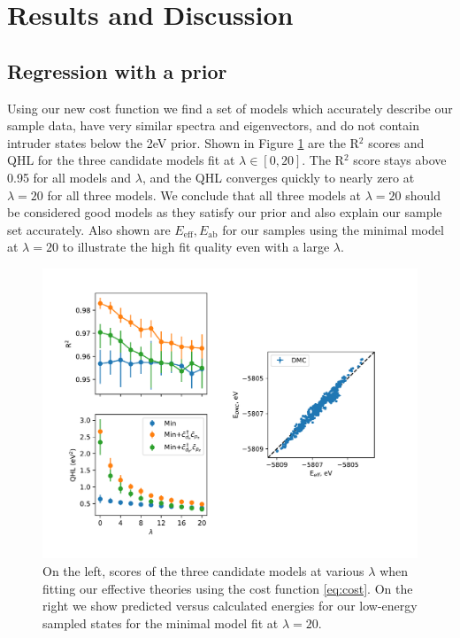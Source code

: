 \documentclass{article}
\begin{document}
\section{Results and Discussion}
\subsection{Regression with a prior}
Using our new cost function we find a set of models which accurately describe our sample data, have very similar spectra and eigenvectors, and do not contain intruder states below the 2eV prior. 
Shown in Figure \ref{fig:Prior} are the R$^2$ scores and QHL for the three candidate models fit at $\lambda \in [0,20]$. 
The R$^2$ score stays above 0.95 for all models and $\lambda$, and the QHL converges quickly to nearly zero at $\lambda = 20$ for all three models. 
We conclude that all three models at $\lambda = 20$ should be considered good models as they satisfy our prior and also explain our sample set accurately. 
Also shown are $E_\text{eff}, E_\text{ab}$ for our samples using the minimal model at $\lambda = 20$ to illustrate the high fit quality even with a large $\lambda$.

\begin{figure}[H]
\centering
\includegraphics[width=0.7\linewidth]{../qwalk/old/ub3lyp_s1_/analysis/figs/prior_and_regr.pdf}
\caption{On the left, scores of the three candidate models at various $\lambda$ when fitting our effective theories using the cost function \eqref{eq:cost}. On the right we show predicted versus calculated energies for our low-energy sampled states for the minimal model fit at $\lambda = 20$.}
\label{fig:Prior}
\end{figure}
\end{document}
